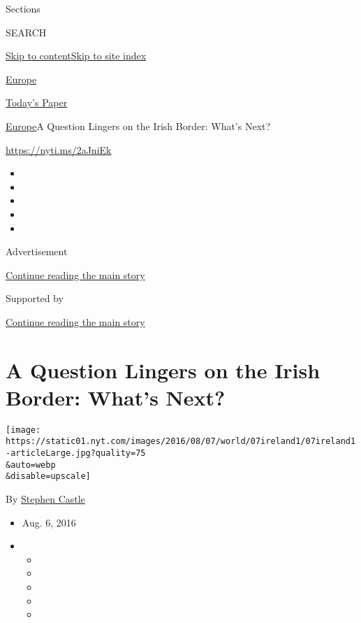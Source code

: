 Sections

SEARCH

\protect\hyperlink{site-content}{Skip to
content}\protect\hyperlink{site-index}{Skip to site index}

\href{https://www.nytimes.com/section/world/europe}{Europe}

\href{https://myaccount.nytimes.com/auth/login?response_type=cookie\&client_id=vi}{}

\href{https://www.nytimes.com/section/todayspaper}{Today's Paper}

\href{/section/world/europe}{Europe}\textbar{}A Question Lingers on the
Irish Border: What's Next?

\url{https://nyti.ms/2aJniEk}

\begin{itemize}
\item
\item
\item
\item
\item
\end{itemize}

Advertisement

\protect\hyperlink{after-top}{Continue reading the main story}

Supported by

\protect\hyperlink{after-sponsor}{Continue reading the main story}

\hypertarget{a-question-lingers-on-the-irish-border-whats-next}{%
\section{A Question Lingers on the Irish Border: What's
Next?}\label{a-question-lingers-on-the-irish-border-whats-next}}

\texttt{[image: https://static01.nyt.com/images/2016/08/07/world/07ireland1/07ireland1-articleLarge.jpg?quality=75\\\&auto=webp\\\&disable=upscale]}

By \href{http://www.nytimes.com/by/stephen-castle}{Stephen Castle}

\begin{itemize}
\item
  Aug. 6, 2016
\item
  \begin{itemize}
  \item
  \item
  \item
  \item
  \item
  \end{itemize}
\end{itemize}

